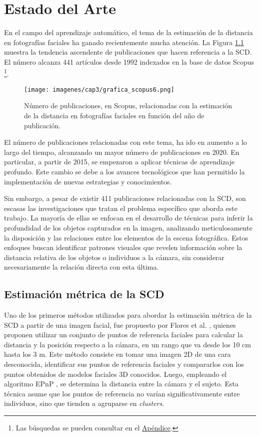 \chapter{Estado del Arte}
\thispagestyle{empty}

En el campo del aprendizaje automático, el tema de la estimación de la distancia en fotografías faciales ha ganado recientemente mucha atención. La Figura \ref{fig16} muestra la tendencia ascendente de publicaciones que hacen referencia a la SCD. El número alcanza 441 artículos desde 1992 indexados en la base de datos Scopus \footnote{Las búsquedas se pueden consultar en el \hyperref[scopus]{Apéndice}.}.

\begin{figure}[H]
	\centering
	\texttt{[image: imagenes/cap3/grafica\_scopus6.png]}
	\caption[Número de publicaciones sobre la estimación de la SCD.]{Número de publicaciones, en Scopus, relacionadas con la estimación de la distancia en fotografías faciales en función del año de publicación.}
	\label{fig16}
\end{figure}

El número de publicaciones relacionadas con este tema, ha ido en aumento a lo largo del tiempo, alcanzando un mayor número de publicaciones en 2020. En particular, a partir de 2015, se empezaron a aplicar técnicas de aprendizaje profundo. Este cambio se debe a los avances tecnológicos que han permitido la implementación de nuevas estrategias y conocimientos.

Sin embargo, a pesar de existir 411 publicaciones relacionadas con la SCD, son escasas las investigaciones que tratan el problema específico que aborda este trabajo. La mayoría de ellas se enfocan en el desarrollo de técnicas para inferir la profundidad de los objetos capturados en la imagen, analizando meticulosamente la disposición y las relaciones entre los elementos de la escena fotográfica. Estos enfoques buscan identificar patrones visuales que revelen información sobre la distancia relativa de los objetos o individuos a la cámara, sin considerar necesariamente la relación directa con esta última.


\section{Estimación métrica de la SCD}

Uno de los primeros métodos utilizados para abordar la estimación métrica de la SCD a partir de una imagen facial, fue propuesto por Flores et al. \cite{28}, quienes proponen utilizar un conjunto de puntos de referencia faciales para calcular la distancia y la posición respecto a la cámara, en un rango que va desde los 10 cm hasta los 3 m.
Este método consiste en tomar una imagen 2D de una cara desconocida, identificar sus puntos de referencia faciales y compararlos con los puntos obtenidos de modelos faciales 3D conocidos. Luego, empleando el algoritmo EPnP \cite{29}, se determina la distancia entre la cámara y el sujeto. Esta técnica asume que los puntos de referencia no varían significativamente entre individuos, sino que tienden a agruparse en \textit{clusters}.

